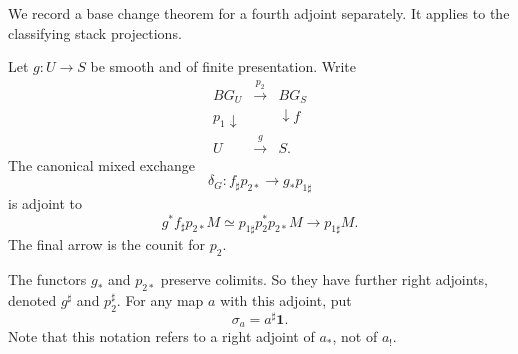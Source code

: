 \documentclass[11pt,reqno]{amsart}
\theoremstyle{definition}
\theoremstyle{remark}
\theoremstyle{plain}
\numberwithin{equation}{section}
\newcommand{\one}{\mathbf 1}
\begin{document}
We record a base change theorem for a fourth adjoint separately.
It applies to the classifying stack projections.

Let \(g:U\to S\) be smooth and of finite presentation.
Write
\begin{equation}\label{eq:mixed-square}
\begin{array}{ccc}
 BG_U&\xrightarrow{p_2}&BG_S\\
 {\scriptstyle p_1}\downarrow&&\downarrow{\scriptstyle f}\\
 U&\xrightarrow{g}&S.
\end{array}
\end{equation}
The canonical mixed exchange
\begin{equation}\label{eq:mixed-exchange}
 \delta_G:f_\sharp p_{2*}\longrightarrow g_*p_{1\sharp}
\end{equation}
is adjoint to
\[
 g^*f_\sharp p_{2*}M
 \simeq p_{1\sharp}p_2^*p_{2*}M
 \longrightarrow p_{1\sharp}M.
\]
The final arrow is the counit for \(p_2\).

The functors \(g_*\) and \(p_{2*}\) preserve colimits.
So they have further right adjoints, denoted \(g^\sharp\) and \(p_2^\sharp\).
For any map \(a\) with this adjoint, put
\[
 \sigma_a=a^\sharp\one.
\]
Note that this notation refers to a right adjoint of \(a_*\), 
not of \(a_!\).
\end{document}

